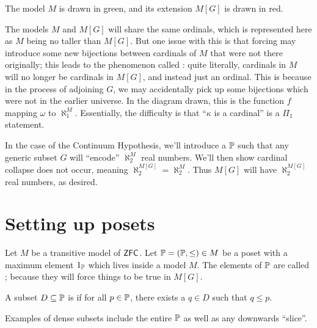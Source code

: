 The model $M$ is drawn in green, and its extension $M[G]$ is drawn in red.

The models $M$ and $M[G]$ will share the same ordinals, which is represented here
as $M$ being no taller than $M[G]$.
But one issue with this is that forcing may introduce some new bijections between cardinals of $M$
that were not there originally; this leads to the phenomenon called :
quite literally, cardinals in $M$ will no longer be cardinals in $M[G]$, and instead just an ordinal.
This is because in the process of adjoining $G$, we may accidentally pick up some bijections which were not in the earlier universe.
In the diagram drawn, this is the function $f$ mapping $\omega$ to $\aleph_1^M$.
Essentially, the difficulty is that ``$\kappa$ is a cardinal'' is a $\Pi_1$ statement.

In the case of the Continuum Hypothesis, we'll introduce a $\mathbb P$ such that
any generic subset $G$ will ``encode'' $\aleph_2^M$ real numbers.
We'll then show cardinal collapse does not occur, meaning $\aleph_2^{M[G]} = \aleph_2^M$.
Thus $M[G]$ will have $\aleph_2^{M[G]}$ real numbers, as desired.

\section{Setting up posets}
Let $M$ be a transitive model of $\mathsf{ZFC}$.
Let $\mathbb P = (\mathbb P, \le) \in M$ be a poset with a maximum element $1_\mathbb P$
which lives inside a model $M$.
The elements of $\mathbb P$ are called ;
because they will force things to be true in $M[G]$.

\begin{definition}
	A subset $D \subseteq \mathbb P$ is  if for all $p \in \mathbb P$,
	there exists a $q  \in D$ such that $q \le p$.
\end{definition}
Examples of dense subsets include the entire $\mathbb P$ as well
as any downwards ``slice''.

